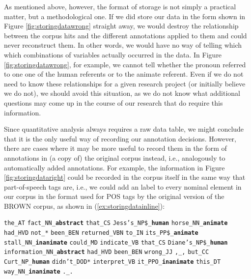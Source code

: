 As mentioned above, however, the format of storage is not simply a practical matter, but a methodological one. If we did store our data in the form shown in Figure \ref{fig:storingdatawrong} straight away, we would destroy the relationship between the corpus hits and the different annotations applied to them and could never reconstruct them. In other words, we would have no way of telling which which combinations of variables actually occurred in the data. In Figure \ref{fig:storingdatawrong}, for example, we cannot tell whether the pronoun referred to one one of the human referents or to the animate referent. Even if we do not need to know these relationships for a given research project (or initially believe we do not), we should avoid this situation, as we do not know what additional questions may come up in the course of our research that do require this information.

Since quantitative analysis always requires a raw data table, we might conclude that it is the only useful way of recording our annotation decisions. However, there are cases where it may be more useful to record them in the form of annotations in (a copy of) the original corpus instead, i.e., analogously to automatically added annotations. For example, the information in Figure \ref{fig:storingdataright} could be recorded in the corpus itself in the same way that part-of-speech tags are, i.e., we could add an  label to every nominal element in our corpus in the format used for POS tags by the original version of the BROWN corpus, as shown in (\ref{ex:storingdatainline}):

\begin{exe}
\ex \begin{minipage}[t]{\textwidth} \raggedright \texttt{the\_AT} \texttt{fact\_NN\_\textbf{abstract}} \texttt{that\_CS} \texttt{Jess's\_NP\$\_\textbf{human}} \texttt{horse\_NN\_\textbf{animate}} \texttt{had\_HVD} \texttt{not\_*} \texttt{been\_BEN} \texttt{returned\_VBN} \texttt{to\_IN} \texttt{its\_PP\$\_\textbf{animate}} \texttt{stall\_NN\_\textbf{inanimate}} \texttt{could\_MD} \texttt{indicate\_VB} \texttt{that\_CS} \texttt{Diane's\_NP\$\_\textbf{human}} \texttt{information\_NN\_\textbf{abstract}} \texttt{had\_HVD} \texttt{been\_BEN} \texttt{wrong\_JJ} \texttt{,\_,} \texttt{but\_CC} \texttt{Curt\_NP\_\textbf{human}} \texttt{didn't\_DOD*} \texttt{interpret\_VB} \texttt{it\_PPO\_\textbf{inanimate}} \texttt{this\_DT} \texttt{way\_NN\_\textbf{inanimate}} \texttt{.\_.} \end{minipage}
\label{ex:storingdatainline}
\end{exe}

